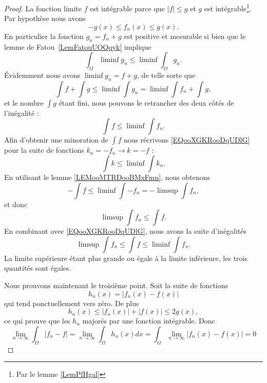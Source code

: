 \begin{proof}

	La fonction limite \( f\) est intégrable parce que \( | f |\leq g\) et \( g\) est intégrable\footnote{Par le lemme \ref{LemPfHgal}}. Par hypothèse nous avons
	\begin{equation}
		-g(x)\leq f_n(x)\leq g(x).
	\end{equation}
	En particulier la fonction \( g_n=f_n+g\) est positive et mesurable si bien que le lemme de Fatou~\ref{LemFatouUOQqyk} implique
	\begin{equation}
		\int_{\Omega}\liminf g_n\leq\liminf\int_{\Omega}g_n.
	\end{equation}
	Évidemment nous avons \( \liminf g_n=f+g\), de telle sorte que
	\begin{equation}
		\int f+\int g\leq \liminf\int g_n=\liminf\int f_n+\int g,
	\end{equation}
	et le nombre \( \int g\) étant fini, nous pouvons le retrancher des deux côtés de l'inégalité :
	\begin{equation}        \label{EQooXGKRooDqUDlG}
		\int f\leq\liminf\int f_n.
	\end{equation}
	Afin d'obtenir une minoration de \( \int f\) nous récrivons \eqref{EQooXGKRooDqUDlG} pour la suite de fonctions \( k_n=-f_n\to k=-f\) :
	\begin{equation}
		\int k\leq \liminf\int k_n.
	\end{equation}
	En utilisant le lemme \ref{LEMooMTRDooBMxFmn}, nous obtenons
	\begin{equation}
		-\int f\leq \liminf\int-f_n=-\limsup\int f_n,
	\end{equation}
	et donc
	\begin{equation}
		\limsup\int f_n\leq \int f.
	\end{equation}
	En combinant avec \eqref{EQooXGKRooDqUDlG}, nous avons la suite d'inégalités
	\begin{equation}
		\limsup\int f_n\leq \int f\leq\liminf\int f_n.
	\end{equation}
	La limite supérieure étant plus grande ou égale à la limite inférieure, les trois quantités sont égales.

	Nous prouvons maintenant le troisième point. Soit la suite de fonctions
	\begin{equation}
		h_n(x)=| f_n(x)-f(x) |
	\end{equation}
	qui tend ponctuellement vers zéro. De plus
	\begin{equation}
		h_n(x)\leq | f_n(x) |+| f(x) |\leq 2g(x),
	\end{equation}
	ce qui prouve que les \( h_n\) majorés par une fonction intégrable. Donc
	\begin{equation}
		\lim_{n\to \infty} \int_{\Omega}| f_n-f |= \lim_{n\to \infty} \int_{\Omega}h_n(x)dx=\int_{\Omega}\lim_{n\to \infty} | f_n(x)-f(x) |=0
	\end{equation}
\end{proof}

